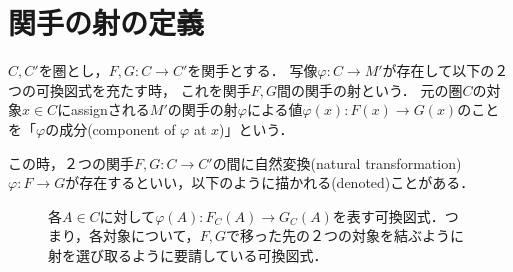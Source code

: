 \documentclass[uplatex, 12pt, dvipdfmx]{jsreport}
\begin{document}
\section{関手の射の定義}
\begin{shadebox}\begin{definition}[関手の射]\rm{}
    $C,C'$を圏とし，$F,G:C\rightarrow C'$を関手とする．
    写像$\varphi : C\rightarrow M'$が存在して以下の２つの可換図式を充たす時，
    これを関手$F,G$間の関手の射という．
    元の圏$C$の対象$x\in C$にassignされる$M'$の関手の射$\varphi$による値$\varphi (x):F(x)\rightarrow G(x)$のことを「$\varphi$の成分(component of $\varphi$ at $x$)」という．

    この時，２つの関手$F,G:C\to C'$の間に自然変換(natural transformation)$\varphi :F\to G$が存在するといい，以下のように描かれる(denoted)ことがある．
    \begin{center}
    \end{center}
\end{definition}\end{shadebox}

\begin{figure}[h]\begin{center}
    \caption{各$A\in C$に対して$\varphi (A):F_C(A)\rightarrow G_C(A)$を表す可換図式．つまり，各対象について，$F,G$で移った先の２つの対象を結ぶように射を選び取るように要請している可換図式．\label{def-cd:13}}
\end{center}\end{figure}
\end{document}
